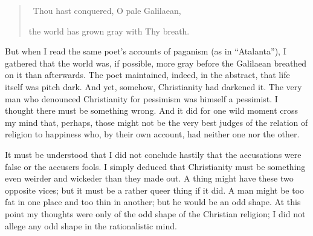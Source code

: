 \documentclass{book}
\begin{document}
\begin{quotation}\
	Thou hast conquered, O pale Galilaean,

	the world has grown gray with Thy breath.
\end{quotation}

But when I read the same poet’s accounts of paganism (as in “Atalanta”), I gathered that the world was, if possible, more gray before the Galilaean breathed on it than afterwards. The poet maintained, indeed, in the abstract, that life itself was pitch dark. And yet, somehow, Christianity had darkened it. The very man who denounced Christianity for pessimism was himself a pessimist. I thought there must be something wrong. And it did for one wild moment cross my mind that, perhaps, those might not be the very best judges of the relation of religion to happiness who, by their own account, had neither one nor the other.

It must be understood that I did not conclude hastily that the accusations were false or the accusers fools. I simply deduced that Christianity must be something even weirder and wickeder than they made out. A thing might have these two opposite vices; but it must be a rather queer thing if it did. A man might be too fat in one place and too thin in another; but he would be an odd shape. At this point my thoughts were only of the odd shape of the Christian religion; I did not allege any odd shape in the rationalistic mind.
\end{document}
